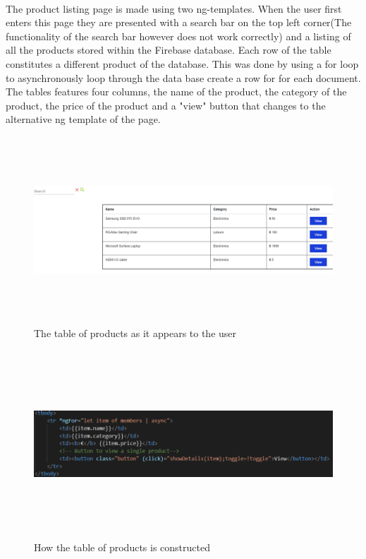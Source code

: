 \paragraph{}
The product listing page is made using two ng-templates. When the user first enters this page they are presented with a search bar on the top left corner(The functionality of the search bar however does not work correctly) and a listing of all the products stored within the Firebase database. Each row of the table constitutes a different product of the database. This was done by using a for loop to asynchronously loop through the data base create a row for for each document. The tables features four columns, the name of the product, the category of the product, the price of the product and a "view" button that changes to the alternative ng template of the page.
\newpage
\begin{figure}[h!]
    	\caption{The table of products as it appears to the user}
	\centering
	\includegraphics[width=12cm, height=7cm]{images/producttable2.png}
\end{figure}
\begin{figure}[h!]
    	\caption{How the table of products is constructed}
	\centering
	\includegraphics[width=12cm, height=7cm]{images/producttable.png}
\end{figure}

